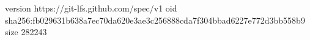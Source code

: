 version https://git-lfs.github.com/spec/v1
oid sha256:fb029631b638a7ec70da620e3ae3c256888cda7f304bbad6227e772d3bb558b9
size 282243
